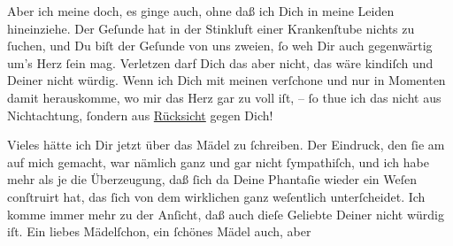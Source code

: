 \pstart
           Aber ich meine doch, es ginge auch, ohne daß ich Dich in meine Leiden hineinziehe.
               Der Geſunde hat in der Stinkluft einer Krankenſtube nichts zu{ }ſuchen, und Du biſt der
               Geſunde von uns zweien,{ }ſo weh Dir auch gegenwärtig um’s Herz{ }ſein mag. Verletzen
               darf Dich das aber nicht, das wäre kindiſch und Deiner nicht würdig. Wenn ich Dich
               mit meinen \label{K_L02651-3v}\label{K_L02651-3} verſchone und nur in {\pb}Momenten damit herauskomme, wo mir das Herz gar zu
               voll iſt, –{ }ſo thue ich das nicht aus Nichtachtung,{ }ſondern aus \uline{Rücksicht} gegen Dich! {\dotsfive}\pend
           
\pstart
           Vieles hätte ich Dir jetzt über das Mädel zu{ }ſchreiben. Der Eindruck, den{ }ſie am \label{K_L02651-4v}\label{K_L02651-4} auf mich gemacht, war nämlich
               ganz und gar nicht{ }ſympathiſch, und ich habe mehr als je die Überzeugung, daß ſich da Deine Phantaſie wieder ein Weſen conſtruirt hat, das{ }ſich von dem wirklichen ganz
               weſentlich unterſcheidet. Ich komme immer mehr zu der Anſicht, daß auch dieſe Geliebte Deiner nicht würdig
               iſt. Ein liebes Mädelſchon,
               ein{ }ſchönes Mädel auch, aber
